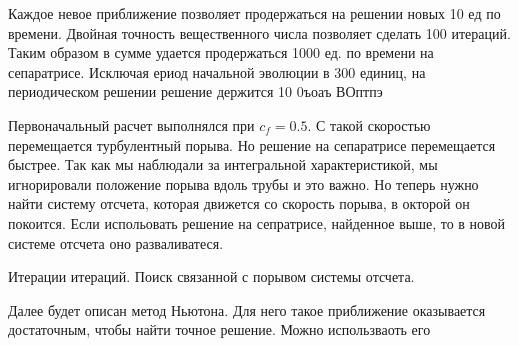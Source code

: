 Каждое невое приближение позволяет продержаться на решении новых 10 ед по времени. Двойная точность вещественного числа позволяет сделать 100 итераций. Таким образом в сумме удается продержаться 1000 ед. по времени на сепаратрисе. Исключая ериод начальной эволюции в 300 единиц, на периодическом решении решение держится 10 0ъоаъ ВОптпэ 


Первоначальный расчет выполнялся при $c_f = 0.5$. С такой скоростью перемещается турбулентный порыва. Но решение на сепаратрисе перемещается быстрее. Так как мы наблюдали за интегральной характеристикой, мы игнорировали положение порыва вдоль трубы и это важно. Но теперь нужно найти систему отсчета, которая движется со скорость порыва, в окторой он покоится. Если испольовать решение на сепратрисе, найденное выше, то в новой системе отсчета оно разваливатеся. 


Итерации итераций. Поиск связанной с порывом системы отсчета. 

Далее будет описан метод Ньютона. Для него такое приближение оказывается достаточным, чтобы найти точное решение. Можно использваоть его 










